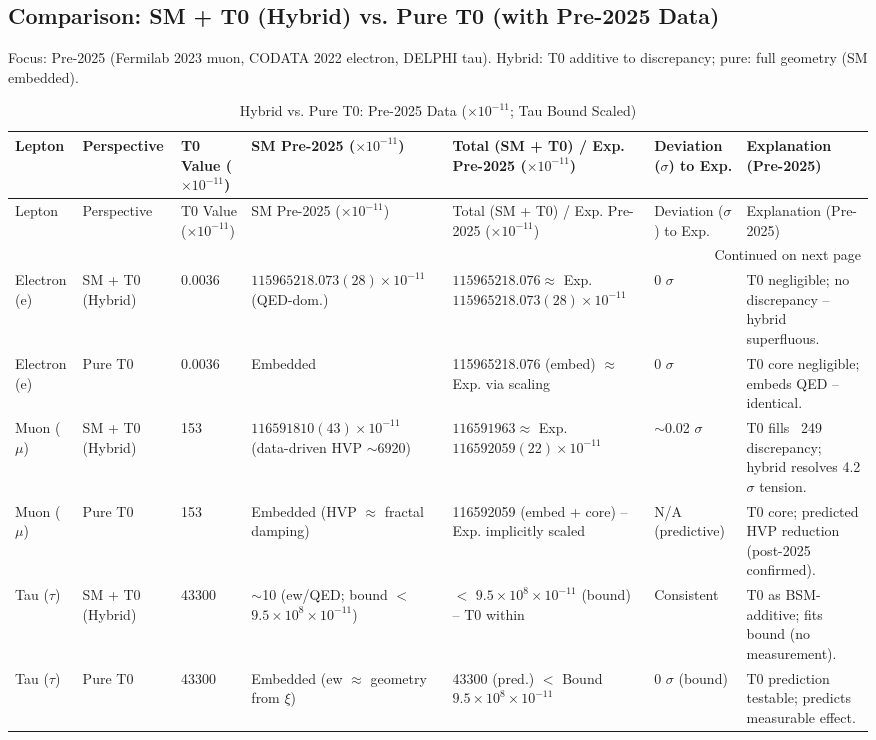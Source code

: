 \documentclass[12pt,a4paper]{article}
\theoremstyle{definition}
\begin{document}
	\subsection{Comparison: SM + T0 (Hybrid) vs. Pure T0 (with Pre-2025 Data)}
	
	Focus: Pre-2025 (Fermilab 2023 muon, CODATA 2022 electron, DELPHI tau). Hybrid: T0 additive to discrepancy; pure: full geometry (SM embedded).
	
	\begin{longtable}{@{}p{1.3cm}p{2cm}p{1cm}p{3.5cm}p{3cm}p{1.8cm}p{2.8cm}@{}}
		\caption{Hybrid vs. Pure T0: Pre-2025 Data ($ \times 10^{-11}$; Tau Bound Scaled)} \label{tab:hybrid_pure}\\
		\toprule
		Lepton & Perspective & T0 Value ($ \times 10^{-11}$) & SM Pre-2025 ($ \times 10^{-11}$) & Total (SM + T0) / Exp. Pre-2025 ($ \times 10^{-11}$) & Deviation ($\sigma$) to Exp. & Explanation (Pre-2025) \\
		\midrule
		\endfirsthead
		
		\toprule
		Lepton & Perspective & T0 Value ($ \times 10^{-11}$) & SM Pre-2025 ($ \times 10^{-11}$) & Total (SM + T0) / Exp. Pre-2025 ($ \times 10^{-11}$) & Deviation ($\sigma$) to Exp. & Explanation (Pre-2025) \\
		\midrule
		\endhead
		
		\bottomrule
		\multicolumn{7}{r}{Continued on next page} \\
		\endfoot
		
		Electron (e) & SM + T0 (Hybrid) & 0.0036 & $115965218.073(28) \times 10^{-11}$ (QED-dom.) & $115965218.076 \approx$ Exp. $115965218.073(28) \times 10^{-11}$ & 0 $\sigma$ & T0 negligible; no discrepancy -- hybrid superfluous. \\
		Electron (e) & Pure T0 & 0.0036 & Embedded & 115965218.076 (embed) $\approx$ Exp. via scaling & 0 $\sigma$ & T0 core negligible; embeds QED -- identical. \\
		Muon ($\mu$) & SM + T0 (Hybrid) & 153 & $116591810(43) \times 10^{-11}$ (data-driven HVP $\sim$6920) & $116591963 \approx$ Exp. $116592059(22) \times 10^{-11}$ & $\sim$0.02 $\sigma$ & T0 fills ~249 discrepancy; hybrid resolves 4.2$\sigma$ tension. \\
		Muon ($\mu$) & Pure T0 & 153 & Embedded (HVP $\approx$ fractal damping) & 116592059 (embed + core) -- Exp. implicitly scaled & N/A (predictive) & T0 core; predicted HVP reduction (post-2025 confirmed). \\
		Tau ($\tau$) & SM + T0 (Hybrid) & 43300 & $\sim$10 (ew/QED; bound $<$ $9.5\times10^{8} \times 10^{-11}$) & $<$ $9.5\times10^{8} \times 10^{-11}$ (bound) -- T0 within & Consistent & T0 as BSM-additive; fits bound (no measurement). \\
		Tau ($\tau$) & Pure T0 & 43300 & Embedded (ew $\approx$ geometry from $\xi$) & 43300 (pred.) $<$ Bound $9.5\times10^{8} \times 10^{-11}$ & 0 $\sigma$ (bound) & T0 prediction testable; predicts measurable effect. \\
	\end{longtable}
	
\end{document}
